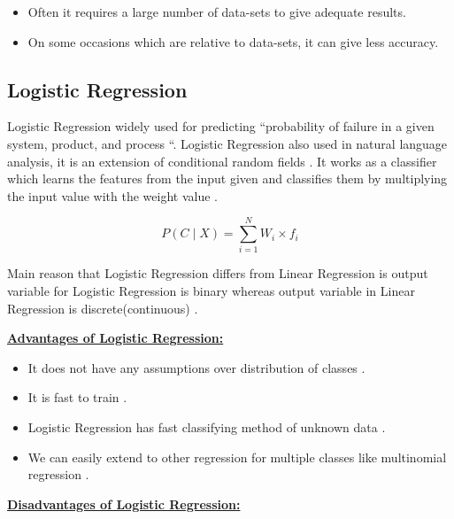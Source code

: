 \documentclass[sigconf]{acmart}
\begin{document}
\begin{itemize}
\item Often it requires a large number of data-sets to give adequate results.
\item On some occasions which are relative to data-sets, it can give less accuracy.
\end{itemize}

\subsection{Logistic Regression}

Logistic Regression widely used for predicting ``probability of failure in a given system, product, and process \cite{adarsh}``. Logistic Regression also used in natural language analysis, it is an extension of conditional random fields \cite{adarsh}. It works as a classifier which learns the features from the input given and classifies them by multiplying the input value with the weight value \cite{tweet-logistic}.

\begin{equation}
P(C \mid X) = \sum_{i=1}^{N} W_i \times f_i 
\end{equation}

\par Main reason that Logistic Regression differs from Linear Regression is output variable for Logistic Regression is binary whereas output variable in Linear Regression is discrete(continuous) \cite{fang-logistic}. 

\textbf{\underline{Advantages of Logistic Regression:}}
\begin{itemize}
\item It does not have any assumptions over distribution of classes \cite{www-washington}.
\item It is fast to train \cite{www-washington}.
\item Logistic Regression has fast classifying method of unknown data \cite{www-washington}.
\item We can easily extend to other regression for multiple classes like multinomial regression \cite{www-washington}. 
\end{itemize}

\textbf{\underline{Disadvantages of Logistic Regression:}}
\end{document}
